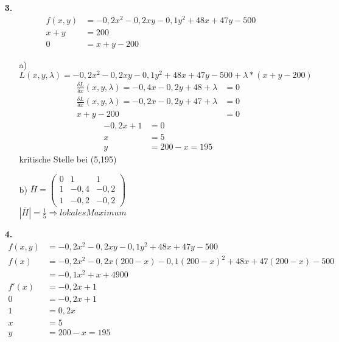 \documentclass[a4paper,11pt,fleqn]{scrartcl}
\begin{document}
\begin{enumerate}
\item[\textbf{3.}]
    \begin{align*}
    	f(x,y)&=-0,2x^2-0,2xy-0,1y^2+48x+47y-500 \\
    	x+y&=200 \\
    	0&=x+y-200
    \end{align*}
    \begin{itemize}
    	\item[a)]
			$L(x,y,\lambda )=-0,2x^2-0,2xy-0,1y^2+48x+47y-500+ \lambda *\left( x+y-200 \right) $\\
			\begin{align*}
				\frac{\delta L}{\delta x}(x,y,\lambda)=-0,4x-0,2y+48+\lambda&=0\\
				\frac{\delta L}{\delta x}(x,y,\lambda)=-0,2x-0,2y+47+\lambda&=0\\
				x+y-200&=0
			\end{align*}
			\begin{align*}
				-0,2x+1&=0\\
				x&=5\\
				y&=200-x=195
			\end{align*}
			kritische Stelle bei (5,195)
		\item[b)]
			$\bar{H}=\left(\begin{matrix}
				0 & 1 & 1 \\
				1 & -0,4 & -0,2 \\
				1 & -0,2 & -0,2 
			\end{matrix}\right)$\\
			$|\bar{H}|=\frac{1}{5} \Rightarrow lokales Maximum $
    \end{itemize}

\item[\textbf{4.}]
	\begin{align*}
		f(x,y)&=-0,2x^2-0,2xy-0,1y^2+48x+47y-500 \\
		f(x)&=-0,2x^2-0,2x\left(200-x\right)-0,1\left(200-x\right)^2+48x+47\left(200-x\right)-500 \\
		&=-0,1x^2+x+4900 \\
		f'(x)&=-0,2x+1 \\
		0&=-0,2x+1\\
		1&=0,2x\\
		x&=5\\
		y&=200-x=195\\
	\end{align*}
\end{enumerate}
\end{document}
